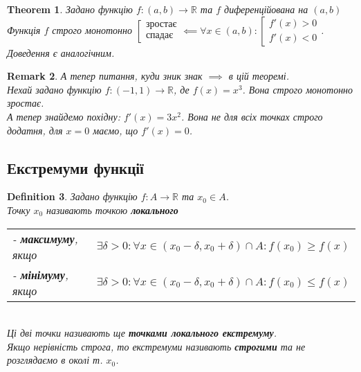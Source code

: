 \documentclass[a4paper, 14pt]{article}
\theoremstyle{theoremdd}
\newtheorem{theorem}{Theorem}[subsection]
\theoremstyle{theoremdd}
\newtheorem{definition}[theorem]{Definition}
\theoremstyle{theoremdd}
\theoremstyle{theoremdd}
\theoremstyle{theoremdd}
\theoremstyle{theoremdd}
\newtheorem{remark}[theorem]{Remark}
\theoremstyle{theoremdd}
\theoremstyle{theoremdd}
\begin{document}
\begin{theorem}
Задано функцію $f: (a,b) \to \mathbb{R}$ та $f$ диференційована на $(a,b)$\\
Функція $f$ строго монотонно $\left[ \begin{gathered} \textrm{зростає} \\ \textrm{спадає} \end{gathered} \right. \impliedby \forall x \in (a,b): \left[ \begin{gathered} f'(x) > 0 \\ f'(x) < 0 \end{gathered} \right.$.\\
\textit{Доведення є аналогічним.}
\end{theorem}

\begin{remark}
А тепер питання, куди зник знак $\implies$ в цій теоремі.\\
Нехай задано функцію $f: (-1,1) \to \mathbb{R}$, де $f(x) = x^3$. Вона строго монотонно зростає.\\
А тепер знайдемо похідну: $f'(x) = 3x^2$. Вона не для всіх точках строго додатня, для $x = 0$ маємо, що $f'(x) = 0$.
\end{remark}

\subsection{Екстремуми функції}
\begin{definition}
Задано функцію $f: A \to \mathbb{R}$ та $x_0 \in A$.\\
Точку $x_0$ називають точкою \textbf{локального}\\
\begin{tabular}{ll}
- \textbf{максимуму}, якщо & $\exists \delta > 0: \forall x \in (x_0-\delta, x_0 +\delta) \cap A: f(x_0) \geq f(x)$\\
- \textbf{мінімуму}, якщо & $\exists \delta > 0: \forall x \in (x_0-\delta, x_0 +\delta) \cap A: f(x_0) \leq f(x)$
\end{tabular}\\
Ці дві точки називають ще \textbf{точками локального екстремуму}.\\
Якщо нерівність строга, то екстремуми називають \textbf{строгими} та не розглядаємо в околі т. $x_0$.
\end{definition}
\end{document}
